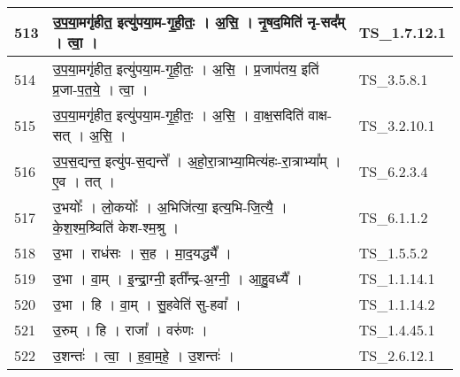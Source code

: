 \documentclass[17pt]{extarticle}
\begin{document}
\begin{longtable}{||p{0.4in}||p{4.9in}||p{0.9in}||}
    \hline
        
    513 & उ॒प॒या॒मगृ॑हीत॒ इत्यु॑पया॒म{-}गृ॒ही॒तः॒   ।   अ॒सि॒   ।   नृ॒षद॒मिति॑ नृ{-}सद᳚म्   ।   त्वा॒   ।    & TS\_1.7.12.1       \\
    
    \hline
        
    514 & उ॒प॒या॒मगृ॑हीत॒ इत्यु॑पया॒म{-}गृ॒ही॒तः॒   ।   अ॒सि॒   ।   प्र॒जाप॑तय॒ इति॑ प्र॒जा{-}प॒त॒ये॒   ।   त्वा॒   ।    & TS\_3.5.8.1       \\
    
    \hline
        
    515 & उ॒प॒या॒मगृ॑हीत॒ इत्यु॑पया॒म{-}गृ॒ही॒तः॒   ।   अ॒सि॒   ।   वा॒क्ष॒सदिति॑ वाक्ष{-}सत्   ।   अ॒सि॒   ।    & TS\_3.2.10.1       \\
    
    \hline
        
    516 & उ॒प॒स॒द्यन्त॒ इत्यु॑प{-}स॒द्यन्ते᳚   ।   अ॒हो॒रा॒त्राभ्या॒मित्य॑हः{-}रा॒त्राभ्या᳚म्   ।   ए॒व   ।   तत्   ।    & TS\_6.2.3.4       \\
    
    \hline
        
    517 & उ॒भयोः᳚   ।   लो॒कयोः᳚   ।   अ॒भिजि॑त्या॒ इत्य॒भि{-}जि॒त्यै॒   ।   के॒श॒श्म॒श्र्विति॑ केश{-}श्म॒श्रु   ।    & TS\_6.1.1.2       \\
    
    \hline
        
    518 & उ॒भा   ।   राध॑सः   ।   स॒ह   ।   मा॒द॒यद्ध्यै᳚   ।    & TS\_1.5.5.2       \\
    
    \hline
        
    519 & उ॒भा   ।   वा॒म्   ।   इ॒न्द्रा॒ग्नी॒ इती᳚न्द्र{-}अ॒ग्नी॒   ।   आ॒हु॒वध्यै᳚   ।    & TS\_1.1.14.1       \\
    
    \hline
        
    520 & उ॒भा   ।   हि   ।   वा॒म्   ।   सु॒हवेति॑ सु{-}हवा᳚   ।    & TS\_1.1.14.2       \\
    
    \hline
        
    521 & उ॒रुम्   ।   हि   ।   राजा᳚   ।   वरु॑णः   ।    & TS\_1.4.45.1       \\
    
    \hline
        
    522 & उ॒शन्तः॑   ।   त्वा॒   ।   ह॒वा॒म॒हे॒   ।   उ॒शन्तः॑   ।    & TS\_2.6.12.1       \\
    

\end{longtable}
\end{document}

